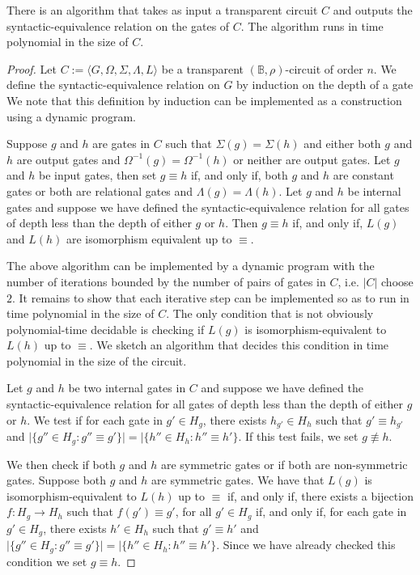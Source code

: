 \documentclass[../paper.tex]{subfiles}
\begin{document}
\begin{lem}
  There is an algorithm that takes as input a transparent circuit $C$ and
  outputs the syntactic-equivalence relation on the gates of $C$. The algorithm
  runs in time polynomial in the size of $C$.
  \label{lem:transparent-syntactic-equiv}
\end{lem}
\begin{proof}
  Let $C := \langle G, \Omega, \Sigma, \Lambda, L \rangle$ be a transparent
  $(\mathbb{B}, \rho)$-circuit of order $n$. We define the syntactic-equivalence
  relation on $G$ by induction on the depth of a gate We note that this
  definition by induction can be implemented as a construction using a dynamic program.
  
  Suppose $g$ and $h$ are gates in $C$ such that $\Sigma (g) = \Sigma(h)$ and
  either both $g$ and $h$ are output gates and $\Omega^{-1}(g) = \Omega^{-1}(h)$
  or neither are output gates. Let $g$ and $h$ be input gates, then set $g
  \equiv h$ if, and only if, both $g$ and $h$ are constant gates or both are
  relational gates and $\Lambda(g) = \Lambda (h)$. Let $g$ and $h$ be internal
  gates and suppose we have defined the syntactic-equivalence relation for all
  gates of depth less than the depth of either $g$ or $h$. Then $g \equiv h$
  if, and only if, $L(g)$ and $L(h)$ are isomorphism equivalent up to $\equiv$.

  The above algorithm can be implemented by a dynamic program with the number of
  iterations bounded by the number of pairs of gates in $C$, i.e. $\vert C
  \vert$ choose $2$. It remains to show that each iterative step can be
  implemented so as to run in time polynomial in the size of $C$. The only
  condition that is not obviously polynomial-time decidable is checking if
  $L(g)$ is isomorphism-equivalent to $L(h)$ up to $\equiv$. We sketch an
  algorithm that decides this condition in time polynomial in the size of the
  circuit.
  
  Let $g$ and $h$ be two internal gates in $C$ and suppose we have defined the
  syntactic-equivalence relation for all gates of depth less than the depth of
  either $g$ or $h$. We test if for each gate in $g' \in H_g$, there exists
  $h_{g'} \in H_h$ such that $g' \equiv h_{g'}$ and $\vert \{g'' \in H_g : g''
  \equiv g'\} \vert = \vert \{h'' \in H_h : h'' \equiv h'\}$. If this test
  fails, we set $g \not\equiv h$.

  We then check if both $g$ and $h$ are symmetric gates or if both are
  non-symmetric gates. Suppose both $g$ and $h$ are symmetric gates. We have
  that $L(g)$ is isomorphism-equivalent to $L(h)$ up to $\equiv$ if, and only
  if, there exists a bijection $f : H_g \rightarrow H_h$ such that $f(g') \equiv
  g'$, for all $g' \in H_g$ if, and only if, for each gate in $g' \in H_g$,
  there exists $h' \in H_h$ such that $g' \equiv h'$ and $\vert \{g'' \in H_g :
  g'' \equiv g'\} \vert = \vert \{h'' \in H_h : h'' \equiv h'\}$. Since we have
  already checked this condition we set $g \equiv h$.


\end{proof}
\end{document}
